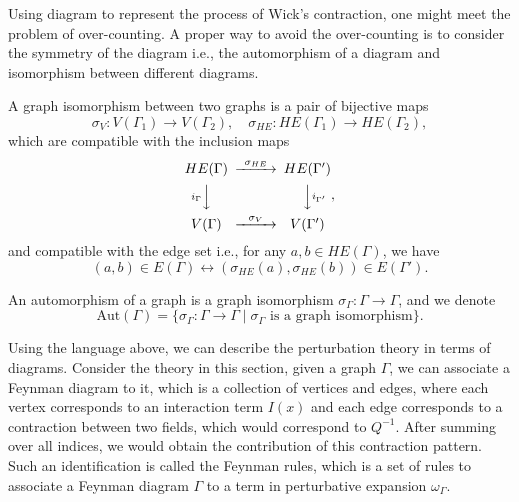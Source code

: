 \documentclass[10pt]{article}
\begin{document}
Using diagram to represent the process of Wick's contraction, one might meet the problem of over-counting.
A proper way to avoid the over-counting is to consider the symmetry of the diagram i.e., the automorphism of a diagram and isomorphism between different diagrams.

\begin{definition}
  A graph isomorphism between two graphs is a pair of bijective maps
  \begin{equation*}
    \sigma_{V} : V(\Gamma_1) \rightarrow V(\Gamma_2), \quad \sigma_{HE} : HE(\Gamma_1) \rightarrow HE(\Gamma_2),
  \end{equation*}
  which are compatible with the inclusion maps
  \begin{equation*}
    \begin{CD}
      HE(\Gamma) @>\sigma_{HE}>> HE(\Gamma') \\
      @V{i_{\Gamma}}VV @VV{i_{\Gamma'}}V \\
      V(\Gamma) @>\sigma_V>> V(\Gamma')
    \end{CD},
  \end{equation*}
  and compatible with the edge set i.e., for any $ a, b \in HE(\Gamma)$, we have
  \begin{equation*}
    (a,b) \in E(\Gamma) \leftrightarrow (\sigma_{HE}(a), \sigma_{HE}(b)) \in E(\Gamma').
  \end{equation*}
\end{definition}
An automorphism of a graph is a graph isomorphism $ \sigma_{\Gamma} : \Gamma \rightarrow \Gamma$, and we denote
\begin{equation*}
  \mathrm{Aut}(\Gamma) = \{ \sigma_{\Gamma} : \Gamma \rightarrow \Gamma \mid \sigma_{\Gamma} \text{ is a graph isomorphism} \}.
\end{equation*}

Using the language above, we can describe the perturbation theory in terms of diagrams.
Consider the theory in this section, given a graph $ \Gamma$, we can associate a Feynman diagram to it, which is a collection of vertices and edges, where each vertex corresponds to an interaction term $ I(x)$ and each edge corresponds to a contraction between two fields, which would correspond to $ Q^{-1}$.
After summing over all indices, we would obtain the contribution of this contraction pattern.
Such an identification is called the Feynman rules, which is a set of rules to associate a Feynman diagram $ \Gamma$  to a term in perturbative expansion $ \omega_{\Gamma}$.
\end{document}
